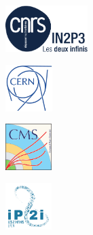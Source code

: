 \begin{titlepage}
\begin{center}
	\begin{minipage}[t]{.225\textwidth}
		\begin{center}
			\includegraphics[height=1.8cm]{./FrontBackMatter/IN2P3-B_SignV_bleu-eps-converted-to.pdf}
		\end{center}
	\end{minipage}
	\hfill
	\begin{minipage}[t]{.225\textwidth}
		\begin{center}
			\includegraphics[height=1.8cm]{./FrontBackMatter/CERN-logo.jpg}
		\end{center}
	\end{minipage}
	\hfill
	\begin{minipage}[t]{.225\textwidth}
		\begin{center}
			\includegraphics[height=1.8cm]{./FrontBackMatter/CMS_logo.pdf}
		\end{center}
	\end{minipage}
	\hfill
	\begin{minipage}[t]{.225\textwidth}
		\begin{center}
			\includegraphics[trim=1cm .85cm 1cm 1cm, clip, height=1.8cm]{./FrontBackMatter/logo_IP2I.pdf}
		\end{center}
	\end{minipage}
	

\end{center}


\end{titlepage}
